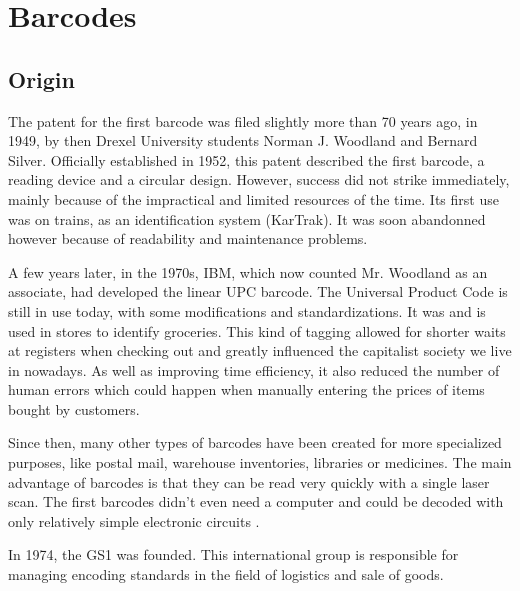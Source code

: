 \chapter{Barcodes}
\label{chap:barcode_origin}

\section{Origin}
\label{sec:barcode_origin}

The patent for the first barcode\cite{barcode_patent} was filed slightly more than 70 years ago, in 1949, by then Drexel University students Norman J. Woodland and Bernard Silver. Officially established in 1952, this patent described the first barcode, a reading device and a circular design. However, success did not strike immediately, mainly because of the impractical and limited resources of the time.
Its first use was on trains, as an identification system (KarTrak\cite{kartrak}). It was soon abandonned however because of readability and maintenance problems.

A few years later, in the 1970s, IBM, which now counted Mr. Woodland as an associate, had developed the linear UPC barcode. The Universal Product Code is still in use today, with some modifications and standardizations. It was and is used in stores to identify groceries. This kind of tagging allowed for shorter waits at registers when checking out and greatly influenced the capitalist society we live in nowadays. As well as improving time efficiency, it also reduced the number of human errors which could happen when manually entering the prices of items bought by customers.

Since then, many other types of barcodes have been created for more specialized purposes, like postal mail, warehouse inventories, libraries or medicines. The main advantage of barcodes is that they can be read very quickly with a single laser scan. The first barcodes didn't even need a computer and could be decoded with only relatively simple electronic circuits \cite[p.3]{barcode_patent}.

In 1974, the GS1 was founded. This international group is responsible for managing encoding standards in the field of logistics and sale of goods.
